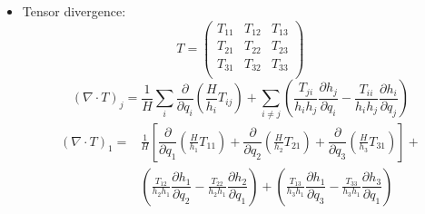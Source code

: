 \documentclass{article}
\numberwithin{equation}{section}
\newcommand{\pd}[2]{\dfrac{\partial #1}{\partial #2}}
\begin{document}
\begin{itemize}
\begin{equation}
\begin{matrix}
            \dfrac{1}{h_2} \pd{u_2}{q_2} +
            \dfrac{u_1}{h_2 h_1} \pd{h_2}{q_1} +
            \dfrac{u_3}{h_2 h_3} \pd{h_2}{q_3} &
            \dfrac{1}{h_2} \pd{u_3}{q_2} - \dfrac{u_2}{h_2 h_3} \pd{h_2}{q_3} \\
            \dfrac{1}{h_3} \pd{u_1}{q_3} - \dfrac{u_3}{h_3 h_1} \pd{h_3}{q_1} &
            \dfrac{1}{h_3} \pd{u_2}{q_3} - \dfrac{u_3}{h_3 h_2} \pd{h_3}{q_2} &
            \dfrac{1}{h_3} \pd{u_3}{q_3} +
            \dfrac{u_2}{h_3 h_2} \pd{h_3}{q_2} +
            \dfrac{u_3}{h_3 h_3} \pd{h_3}{q_3}
        \end{matrix}\right)
    \end{equation}
    \item Tensor divergence:
    \begin{equation}
        T = \left(\begin{matrix}
            T_{11} & T_{12} & T_{13} \\
            T_{21} & T_{22} & T_{23} \\
            T_{31} & T_{32} & T_{33} \\
        \end{matrix}\right)
    \end{equation}
    \begin{equation}
        \left(\nabla \cdot T\right)_j =
        \frac{1}{H} \sum_i \pd{}{q_i} \left(
            \frac{H}{h_i} T_{ij}
        \right) + 
        \sum_{i \ne j} \left(
            \frac{T_{ji}}{h_ih_j} \pd{h_j}{q_i} -
            \frac{T_{ii}}{h_ih_j} \pd{h_i}{q_j}
        \right)
    \end{equation}
    \begin{equation}
        \begin{split}
            \left(\nabla \cdot T\right)_1 =
            &\frac{1}{H} \left[
                  \pd{}{q_1} \left(\frac{H}{h_1} T_{11}\right)
                + \pd{}{q_2} \left(\frac{H}{h_2} T_{21}\right)
                + \pd{}{q_3} \left(\frac{H}{h_3} T_{31}\right)
            \right] + \\
            &\left(
                \frac{T_{12}}{h_2h_1} \pd{h_1}{q_2} -
                \frac{T_{22}}{h_2h_1} \pd{h_2}{q_1}
            \right) +
            \left(
                \frac{T_{13}}{h_3h_1} \pd{h_1}{q_3} -
                \frac{T_{33}}{h_3h_1} \pd{h_3}{q_1}
            \right)
        \end{split}
    \end{equation}
\end{itemize}
\end{document}
